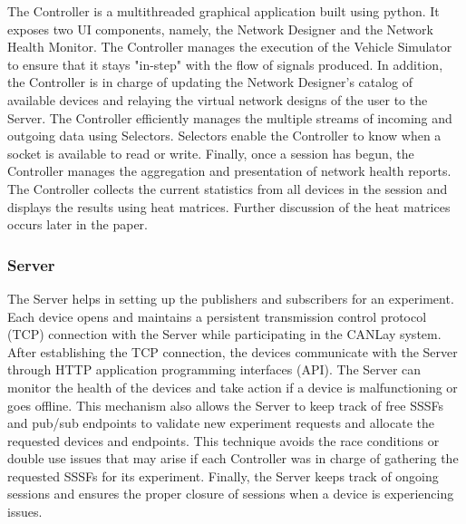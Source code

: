 \documentclass[letterpaper,twocolumn,12pt]{article}
\begin{document}
The Controller is a multithreaded graphical application built using python. It exposes two UI components, namely, the Network Designer and the Network Health Monitor. 
The Controller manages the execution of the Vehicle Simulator to ensure that it stays "in-step" with the flow of signals produced. 
In addition, the Controller is in charge of updating the Network Designer's catalog of available devices and relaying the virtual network designs of the user to the Server. The Controller efficiently manages the multiple streams of incoming and outgoing data using Selectors. Selectors enable the Controller to know when a socket is available to read or write. Finally, once a session has begun, the Controller manages the aggregation and presentation of network health reports. The Controller collects the current statistics from all devices in the session and displays the results using heat matrices. Further discussion of the heat matrices occurs later in the paper.

\subsubsection{Server}
The Server helps in setting up the publishers and subscribers for an experiment. Each device opens and maintains a persistent transmission control protocol (TCP) connection with the Server while participating in the CANLay system. 
After establishing the TCP connection, the devices communicate with the Server through HTTP application programming interfaces (API). 
The Server can monitor the health of the devices and take action if a device is malfunctioning or goes offline. 
This mechanism also allows the Server to keep track of free SSSFs and pub/sub endpoints to validate new experiment requests and allocate the requested devices and endpoints. This technique avoids the race conditions or double use issues that may arise if each Controller was in charge of gathering the requested SSSFs for its experiment. 
Finally, the Server keeps track of ongoing sessions and ensures the proper closure of sessions when a device is experiencing issues.
\end{document}
